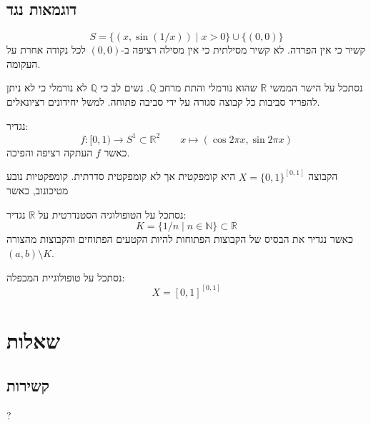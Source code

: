 \documentclass{tstextbook}
\begin{document}
\section{דוגמאות נגד}

\begin{example}
$$S=\{(x,\sin(1/x))\mid x>0\}\cup\{(0,0)\}$$
קשיר כי אין הפרדה. לא קשיר מסילתית כי אין מסילה רציפה ב-\((0,0)\) לכל נקודה אחרת על העקומה.

\end{example}
\begin{example}
נסתכל על הישר הממשי \(\mathbb{R}\) שהוא נורמלי והתת מרחב \(\mathbb{Q}\). נשים לב כי \(\mathbb{Q}\) לא נורמלי כי לא ניתן להפריד סביבות כל קבוצה סגורה על ידי סביבה פתוחה. למשל יחידונים רציונאלים.

\end{example}
\begin{example}
נגדיר:
$$f: [0,1) \to S^1 \subset \mathbb{R}^2\qquad x\mapsto\left( \cos 2\pi x,\sin 2\pi x \right)$$
כאשר \(f\) העתקה רציפה והפיכה.

\end{example}
\begin{example}
הקבוצה \(X=\{ 0,1 \}^{[0,1]}\) היא קומפקטית אך לא קומפקטית סדרתית. קומפקטיות נובע מטיכונוב, כאשר 

\end{example}
\begin{example}
נסתכל על הטופולוגיה הסטנדרטית על \(\mathbb{R}\) נגדיר:
$$K = \{1/n \mid n\in\mathbb{N}\} \subset \mathbb{R}$$
כאשר נגדיר את הבסיס של הקבוצות הפתוחות להיות הקטעים הפתוחים והקבוצות מהצורה \((a,b)\setminus K\).

\end{example}
\begin{example}
נסתכל על טופולוגיית המכפלה:
$$X=[0,1]^{[0,1]}$$

\end{example}
\chapter{שאלות}

\section{קשירות}

?
\end{document}
